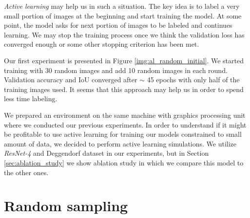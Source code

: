 \textit{Active learning} may help us in such a situation. The key idea is to label a very small portion
of images at the beginning and start training the model. At some point, the model asks for next
portion of images to be labeled and continues learning. We may stop the training process once
we think the validation loss has converged enough or some other stopping criterion has been met.

Our first experiment is presented in Figure \ref{img:al_random_initial}. We started training
with 30 random images and add 10 random images in each round. Validation accuracy and IoU converged
after $\sim$ 45 epochs with only half of the training images used. It seems
that this approach may help us in order to spend less time labeling.

We prepared an environment on the same machine with graphics processing unit
where we conducted our previous experiments.
In order to understand if it might be profitable to use active learning for training
our models constrained to small amount of data, we decided to perform active learning
simulations. We utilize \textit{ResNet-4} and Deggendorf dataset in our experiments,
but in Section \ref{sec:ablation_study} we show ablation study in which we compare this
model to the other ones.

\section{Random sampling}
\label{sec:random_sampling}

